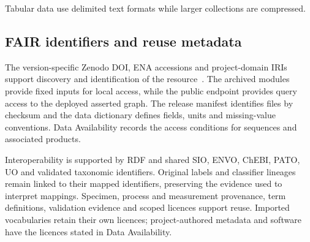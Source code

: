 \begin{revision}
Tabular data use delimited text formats while larger collections are compressed.



\subsection{FAIR identifiers and reuse metadata}
The version-specific Zenodo DOI, ENA accessions and project-domain IRIs support discovery and identification of the resource~\cite{fair}. The archived modules provide fixed inputs for local access, while the public endpoint provides query access to the deployed asserted graph. The release manifest identifies files by checksum and the data dictionary defines fields, units and missing-value conventions. Data Availability records the access conditions for sequences and associated products.

Interoperability is supported by RDF and shared SIO, ENVO, ChEBI, PATO, UO and validated taxonomic identifiers. Original labels and classifier lineages remain linked to their mapped identifiers, preserving the evidence used to interpret mappings. Specimen, process and measurement provenance, term definitions, validation evidence and scoped licences support reuse. Imported vocabularies retain their own licences; project-authored metadata and software have the licences stated in Data Availability.
\end{revision}
